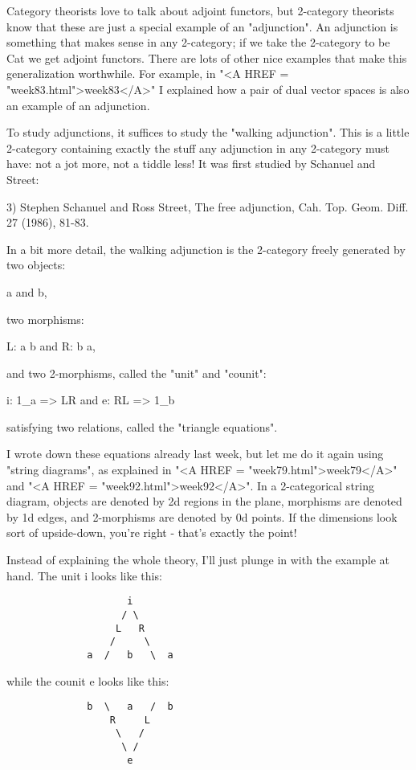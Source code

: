 Category theorists love to talk about adjoint functors, but 2-category
theorists know that these are just a special example of an
"adjunction".  An adjunction is something that makes sense in
any 2-category; if we take the 2-category to be Cat we get adjoint
functors.  There are lots of other nice examples that make this
generalization worthwhile.  For example, in "<A HREF =
"week83.html">week83</A>" I explained how a pair of dual vector
spaces is also an example of an adjunction.


To study adjunctions, it suffices to study the "walking
adjunction".  This is a little 2-category containing exactly the
stuff any adjunction in any 2-category must have: not a jot more, not a
tiddle less!  It was first studied by Schanuel and Street:

3) Stephen Schanuel and Ross Street, The free adjunction,
Cah. Top. Geom.  Diff. 27 (1986), 81-83.

In a bit more detail, the walking adjunction is the 2-category freely
generated by two objects:

a and b,

two morphisms:

L: a \to  b  and  R: b \to  a,

and two 2-morphisms, called the "unit" and "counit":

i: 1_{a} => LR  and  e: RL => 1_{b}

satisfying two relations, called the "triangle equations".  


I wrote down these equations already last week, but let me do it again
using "string diagrams", as explained in "<A HREF =
"week79.html">week79</A>" and "<A HREF =
"week92.html">week92</A>".  In a 2-categorical string diagram,
objects are denoted by 2d regions in the plane, morphisms are denoted by
1d edges, and 2-morphisms are denoted by 0d points.  If the dimensions
look sort of upside-down, you're right - that's exactly the point!

Instead of explaining the whole theory, I'll just plunge in with
the example at hand.  The unit i looks like this:

\begin{verbatim}
                     i
                    / \
                   L   R
                  /     \
              a  /   b   \  a
\end{verbatim}
    
while the counit e looks like this:

\begin{verbatim}
              b  \   a   /  b 
                  R     L  
                   \   / 
                    \ /
                     e
\end{verbatim}
    


